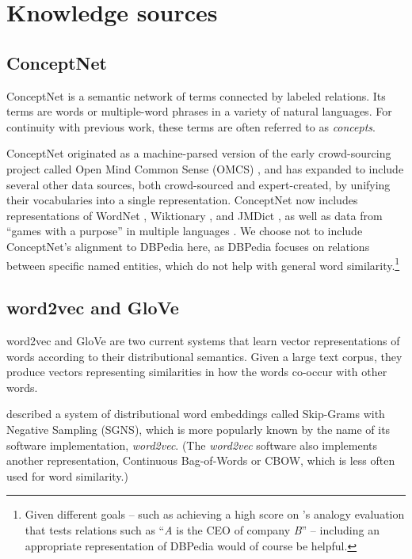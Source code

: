 \documentclass[11pt,letterpaper]{article}
\begin{document}
\section{Knowledge sources}

\subsection{ConceptNet}
ConceptNet \cite{speer2012conceptnet} is a semantic network of terms
connected by labeled relations. Its terms are words or multiple-word phrases
in a variety of natural languages. For continuity with previous work,
these terms are often referred to as {\em concepts}.

ConceptNet originated as a machine-parsed version of the early crowd-sourcing
project called Open Mind Common Sense (OMCS) \cite{singh2002omcs}, and has expanded
to include several other data sources, both crowd-sourced and expert-created,
by unifying their vocabularies into a single representation. ConceptNet now includes
representations of WordNet \cite{miller1998wordnet}, Wiktionary \cite{wiktionary2014en},
and JMDict \cite{breen2004jmdict}, as well as data from ``games with a purpose'' in
multiple languages \cite{vonahn2006verbosity} \cite{nakahara2011nadya}
\cite{kuo2009petgame}. We choose not to include ConceptNet's alignment to DBPedia
here, as DBPedia focuses on relations between specific named entities, which do not help
with general word similarity.\footnote{
    Given different goals -- such as achieving a high score on
    's analogy evaluation that tests relations
    such as ``{\em A} is the CEO of company {\em B}'' -- including an appropriate
    representation of DBPedia would of course be helpful.
}

\subsection{word2vec and GloVe}

word2vec and GloVe are two current systems that learn vector representations
of words according to their distributional semantics. Given a large text corpus,
they produce vectors representing similarities in how the words co-occur with
other words.

 described a system of distributional word
embeddings called Skip-Grams with Negative Sampling (SGNS), which is more
popularly known by the name of its software implementation, {\em word2vec}.
(The {\em word2vec} software also implements another representation, Continuous
Bag-of-Words or CBOW, which is less often used for word similarity.)
\end{document}
